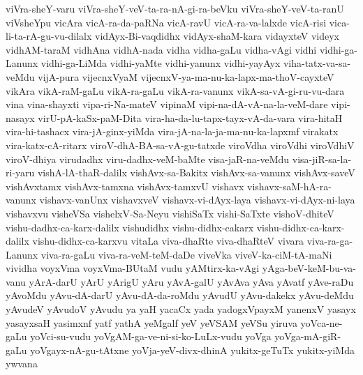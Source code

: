 {viVra-sheY-varu
viVra-sheY-veV-ta-ra-nA-gi-ra-beVku
viVra-sheY-veV-ta-ranU
viVsheYpu
vicAra
vicA-ra-da-paRNa
vicA-ravU
vicA-ra-va-lalxde
vicA-risi
vica-li-ta-rA-gu-vu-dilalx
vidAyx-Bi-vaqdidhx
vidAyx-shaM-kara
vidayxteV
videyx
vidhAM-taraM
vidhAna
vidhA-nada
vidha
vidha-gaLu
vidha-vAgi
vidhi
vidhi-ga-Lanunx
vidhi-ga-LiMda
vidhi-yaMte
vidhi-yanunx
vidhi-yayAyx
viha-tatx-va-sa-veMdu
vijA-pura
vijecnxVyaM
vijecnxV-ya-ma-nu-ka-lapx-ma-thoV-cayxteV
vikAra
vikA-raM-gaLu
vikA-ra-gaLu
vikA-ra-vanunx
vikA-sa-vA-gi-ru-vu-dara
vina
vina-shayxti
vipa-ri-Na-mateV
vipinaM
vipi-na-dA-vA-na-la-veM-dare
vipi-nasayx
virU-pA-kaSx-paM-Dita
vira-ha-da-lu-tapx-tayx-vA-da-vara
vira-hitaH
vira-hi-tashacx
vira-jA-ginx-yiMda
vira-jA-na-la-ja-ma-nu-ka-lapxmf
virakatx
vira-katx-cA-ritarx
viroV-dhA-BA-sa-vA-gu-tatxde
viroVdha
viroVdhi
viroVdhiV
viroV-dhiya
virudadhx
viru-dadhx-veM-baMte
visa-jaR-na-veMdu
visa-jiR-sa-la-ri-yaru
vishA-lA-thaR-dalilx
vishAvx-sa-Bakitx
vishAvx-sa-vanunx
vishAvx-saveV
vishAvxtamx
vishAvx-tamxna
vishAvx-tamxvU
vishavx
vishavx-saM-hA-ra-vanunx
vishavx-vanUnx
vishavxveV
vishavx-vi-dAyx-laya
vishavx-vi-dAyx-ni-laya
vishavxvu
visheVSa
vishelxV-Sa-Neyu
vishiSaTx
vishi-SaTxte
vishoV-dhiteV
vishu-dadhx-ca-karx-dalilx
vishudidhx
vishu-didhx-cakarx
vishu-didhx-ca-karx-dalilx
vishu-didhx-ca-karxvu
vitaLa
viva-dhaRte
viva-dhaRteV
vivara
viva-ra-ga-Lanunx
viva-ra-gaLu
viva-ra-veM-teM-daDe
viveVka
viveV-ka-ciM-tA-maNi
vividha
voyxVma
voyxVma-BUtaM
vudu
yAMtirx-ka-vAgi
yAga-beV-keM-bu-va-vanu
yArA-darU
yArU
yArigU
yAru
yAvA-galU
yAvAva
yAva
yAvatf
yAve-raDu
yAvoMdu
yAvu-dA-darU
yAvu-dA-da-roMdu
yAvudU
yAvu-dakekx
yAvu-deMdu
yAvudeV
yAvudoV
yAvudu
ya
yaH
yacaCx
yada
yadogxVpayxM
yanenxV
yasayx
yasayxsaH
yasimxnf
yatf
yathA
yeMgalf
yeV
yeVSAM
yeVSu
yiruva
yoVca-ne-gaLu
yoVci-su-vudu
yoVgAM-ga-ve-ni-si-ko-LuLx-vudu
yoVga
yoVga-mA-giR-gaLu
yoVgayx-nA-gu-tAtxne
yoVja-yeV-divx-dhinA
yukitx-geTuTx
yukitx-yiMda
ywvana
}
